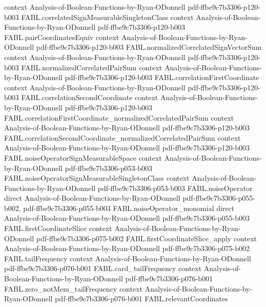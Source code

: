 \begin{theorem}
  {context}
  {Analysis-of-Boolean-Functions-by-Ryan-ODonnell}
  {pdf-ffbe9c7b3306-p120-b003}
\proofstep
  {FABL.correlatedSignMeasurableSingletonClass}
  {context}
  {Analysis-of-Boolean-Functions-by-Ryan-ODonnell}
  {pdf-ffbe9c7b3306-p120-b003}
\proofstep
  {FABL.pairCoordinatesEquiv}
  {context}
  {Analysis-of-Boolean-Functions-by-Ryan-ODonnell}
  {pdf-ffbe9c7b3306-p120-b003}
\proofstep
  {FABL.normalizedCorrelatedSignVectorSum}
  {context}
  {Analysis-of-Boolean-Functions-by-Ryan-ODonnell}
  {pdf-ffbe9c7b3306-p120-b003}
\proofstep
  {FABL.normalizedCorrelatedPairSum}
  {context}
  {Analysis-of-Boolean-Functions-by-Ryan-ODonnell}
  {pdf-ffbe9c7b3306-p120-b003}
\proofstep
  {FABL.correlationFirstCoordinate}
  {context}
  {Analysis-of-Boolean-Functions-by-Ryan-ODonnell}
  {pdf-ffbe9c7b3306-p120-b003}
\proofstep
  {FABL.correlationSecondCoordinate}
  {context}
  {Analysis-of-Boolean-Functions-by-Ryan-ODonnell}
  {pdf-ffbe9c7b3306-p120-b003}
\proofstep
  {FABL.correlationFirstCoordinate_normalizedCorrelatedPairSum}
  {context}
  {Analysis-of-Boolean-Functions-by-Ryan-ODonnell}
  {pdf-ffbe9c7b3306-p120-b003}
\proofstep
  {FABL.correlationSecondCoordinate_normalizedCorrelatedPairSum}
  {context}
  {Analysis-of-Boolean-Functions-by-Ryan-ODonnell}
  {pdf-ffbe9c7b3306-p120-b003}
\proofstep
  {FABL.noiseOperatorSignMeasurableSpace}
  {context}
  {Analysis-of-Boolean-Functions-by-Ryan-ODonnell}
  {pdf-ffbe9c7b3306-p053-b003}
\proofstep
  {FABL.noiseOperatorSignMeasurableSingletonClass}
  {context}
  {Analysis-of-Boolean-Functions-by-Ryan-ODonnell}
  {pdf-ffbe9c7b3306-p053-b003}
\proofstep
  {FABL.noiseOperator}
  {direct}
  {Analysis-of-Boolean-Functions-by-Ryan-ODonnell}
  {pdf-ffbe9c7b3306-p055-b002,
    pdf-ffbe9c7b3306-p055-b003}
\proofstep
  {FABL.noiseOperator_monomial}
  {direct}
  {Analysis-of-Boolean-Functions-by-Ryan-ODonnell}
  {pdf-ffbe9c7b3306-p055-b003}
\proofstep
  {FABL.firstCoordinateSlice}
  {context}
  {Analysis-of-Boolean-Functions-by-Ryan-ODonnell}
  {pdf-ffbe9c7b3306-p075-b002}
\proofstep
  {FABL.firstCoordinateSlice_apply}
  {context}
  {Analysis-of-Boolean-Functions-by-Ryan-ODonnell}
  {pdf-ffbe9c7b3306-p075-b002}
\proofstep
  {FABL.tailFrequency}
  {context}
  {Analysis-of-Boolean-Functions-by-Ryan-ODonnell}
  {pdf-ffbe9c7b3306-p076-b001}
\proofstep
  {FABL.card_tailFrequency}
  {context}
  {Analysis-of-Boolean-Functions-by-Ryan-ODonnell}
  {pdf-ffbe9c7b3306-p076-b001}
\proofstep
  {FABL.zero_notMem_tailFrequency}
  {context}
  {Analysis-of-Boolean-Functions-by-Ryan-ODonnell}
  {pdf-ffbe9c7b3306-p076-b001}
\proofstep
  {FABL.relevantCoordinates}

\end{theorem}

